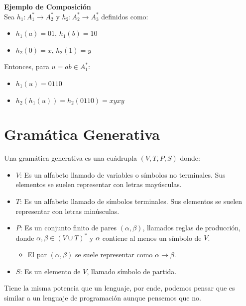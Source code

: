 \documentclass[12pt]{report} %
\providecommand{\tightlist}{%
  \setlength{\itemsep}{0pt}\setlength{\parskip}{0pt}}
\begin{document}
\textbf{Ejemplo de Composición}\\
Sea \(h_1 : A_1^* \to A_2^*\) y \(h_2 : A_2^* \to A_3^*\) definidos
como:

\begin{itemize}
\tightlist
\item
  \(h_1(a) = 01\), \(h_1(b) = 10\)
\item
  \(h_2(0) = x\), \(h_2(1) = y\)
\end{itemize}

Entonces, para \(u = ab \in A_1^*\):

\begin{itemize}
\tightlist
\item
  \(h_1(u) = 0110\)
\item
  \(h_2(h_1(u)) = h_2(0110) = xyxy\)
\end{itemize}

\hypertarget{gramuxe1tica-generativa}{%
\section{Gramática Generativa}\label{gramuxe1tica-generativa}}

\begin{definicion}
Una gramática generativa es una cuádrupla $(V, T, P, S)$ donde:

\begin{itemize}
    \item \textbf{$V$}: Es un alfabeto llamado de variables o símbolos no terminales. Sus elementos se suelen representar con letras mayúsculas.
    \item \textbf{$T$}: Es un alfabeto llamado de símbolos terminales. Sus elementos se suelen representar con letras minúsculas.
    \item \textbf{$P$}: Es un conjunto finito de pares $(\alpha, \beta)$, llamados reglas de producción, donde $\alpha, \beta \in (V \cup T)^*$ y $\alpha$ contiene al menos un símbolo de $V$.
        \begin{itemize}
            \item El par $(\alpha, \beta)$ se suele representar como $\alpha \to \beta$.
        \end{itemize}
    \item \textbf{$S$}: Es un elemento de $V$, llamado símbolo de partida.
\end{itemize}
\end{definicion}

Tiene la misma potencia que un lenguaje, por ende, podemos pensar que es
similar a un lenguaje de programación aunque pensemos que no.
\end{document}

